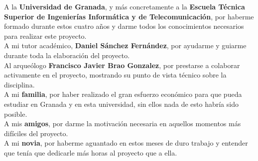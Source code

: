 A la \textbf{Universidad de Granada}, y más concretamente a la \textbf{Escuela
Técnica Superior de Ingenierías Informática y de Telecomunicación}, por haberme formado
durante estos cuatro años y darme todos los conocimientos necesarios para realizar este
proyecto. \\

A mi tutor académico, \textbf{Daniel Sánchez Fernández}, por ayudarme y guiarme durante
toda la elaboración del proyecto. \\

Al arqueólogo \textbf{Francisco Javier Brao Gonzalez}, por prestarse a colaborar
activamente en el proyecto, mostrando su punto de vista técnico sobre la disciplina. \\

A mi \textbf{familia}, por haber realizado el gran esfuerzo económico para que pueda
estudiar en Granada y en esta universidad, sin ellos nada de esto habría sido posible. \\

A mis \textbf{amigos}, por darme la motivación necesaria en aquellos momentos más
difíciles del proyecto. \\

A mi \textbf{novia}, por haberme aguantado en estos meses de duro trabajo y entender
que tenía que dedicarle más horas al proyecto que a ella. \\

